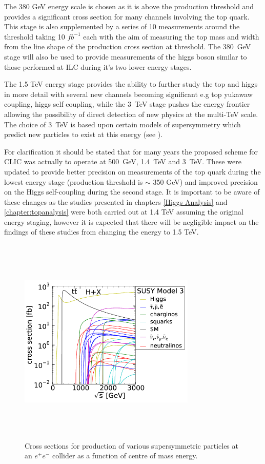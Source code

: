The 380 GeV energy scale is chosen as it is above the \ttbar production threshold and provides a significant cross section for many channels involving the top quark. This stage is also supplemented by a series of 10 measurements around the \ttbar threshold taking 10 ${fb^{-1}}$ each with the aim of measuring the top mass and width from the line shape of the \ttbar production cross section at threshold. The 380~GeV stage will also be used to provide measurements of the higgs boson similar to those performed at \ac{ILC} during it's two lower energy stages.

The 1.5 TeV energy stage provides the ability to further study the top and higgs in more detail with several new channels becoming significant e.g top yukawaw coupling, higgs self coupling, while the 3~TeV stage pushes the energy frontier allowing the possibility of direct detection of new physics at the multi-TeV scale. The choice of 3~TeV is based upon certain models of supersymmetry which predict new particles to exist at this energy (see ).

For clarification it should be stated that for many years the proposed scheme for CLIC was actually to operate at 500~GeV, 1.4~TeV and 3~TeV. These were updated to provide better precision on measurements of the top quark during the lowest energy stage (\ttbar production threshold is $\sim$ 350 GeV) and improved precision on the Higgs self-coupling during the second stage. It is important to be aware of these changes as the studies presented in chapters \ref{Higgs Analysis} and \ref{chapter:topanalysis} were both carried out at 1.4 TeV assuming the original energy staging, however it is expected that there will be negligible impact on the findings of these studies from changing the energy to 1.5 TeV.  

\begin{figure}
  \centering
  \includegraphics[width=0.75\textwidth,height=10cm,keepaspectratio]{Experiments/fig/clicSS}
  \caption[Cross Sections For Supersymmetric Processes at \ac{CLIC}]{Cross sections for production of various supersymmetric particles at an ${e^+e^-}$ collider as a function of centre of mass energy.}
  \label{Fig:SuperSym}
\end{figure}

